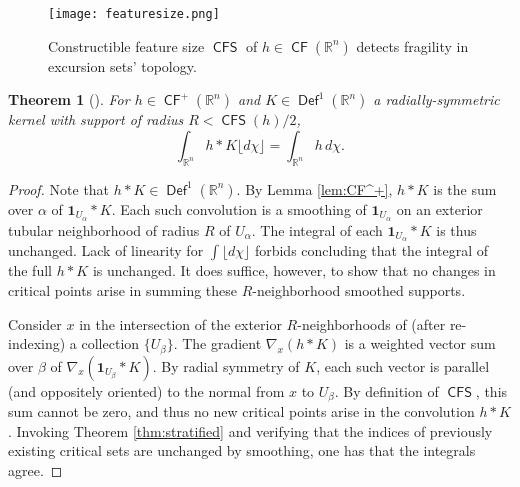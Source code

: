 \documentclass{psapm-l}
\newtheorem{theorem}{Theorem}[section]
\theoremstyle{definition}
\theoremstyle{remark}
\numberwithin{equation}{section}
\begin{document}
\begin{figure}[hbt]
\begin{center}
\texttt{[image: featuresize.png]}
\caption{Constructible feature size ${{{\operatorname{\mathsf{{CFS}}}}}}$ of $h\in{{{\operatorname{\mathsf{{CF}}}}}}({{\mathbb R}}^n)$ detects fragility in excursion sets' topology.}
\label{fig:CFS}
\end{center}
\end{figure}

\begin{theorem}[\cite{BG:PNAS}]
\label{thm:conv=}
For $h\in {{{\operatorname{\mathsf{{CF}}}}}}^+({{\mathbb R}}^n)$ and ${{K}}\in{{{\operatorname{\mathsf{{Def}}}}}}^1({{\mathbb R}}^n)$ a radially-symmetric kernel with support of radius $R<{{{\operatorname{\mathsf{{CFS}}}}}}(h)/2$,
\begin{equation}
\label{eq:conv=}
    \int_{{{\mathbb R}}^n} h*{{K}} {{\lfloor d\chi\rfloor}}
    =
    \int_{{{\mathbb R}}^n} h\,d\chi   .
\end{equation}
\end{theorem}
\begin{proof}
Note that $h*{{K}}\in{{{\operatorname{\mathsf{{Def}}}}}}^1({{\mathbb R}}^n)$. By Lemma \ref{lem:CF^+}, $h*{{K}}$ is the sum over $\alpha$ of ${{\mathbf{1}}}_{U_\alpha}*{{K}}$. Each such convolution is a smoothing of ${{\mathbf{1}}}_{U_\alpha}$ on an exterior tubular neighborhood of radius $R$ of $U_\alpha$. The integral of each ${{\mathbf{1}}}_{U_\alpha}*{{K}}$ is thus unchanged. Lack of linearity for $\int{{\lfloor d\chi\rfloor}}$ forbids concluding that the integral of the full $h*{{K}}$ is unchanged. It does suffice, however, to show that no changes in critical points arise in summing these $R$-neighborhood smoothed supports.

Consider $x$ in the intersection of the exterior $R$-neighborhoods of (after re-indexing) a collection $\{U_\beta\}$. The gradient $\nabla_x(h*{{K}})$ is a weighted vector sum over $\beta$ of $\nabla_x({{\mathbf{1}}}_{U_\beta}*{{K}})$. By radial symmetry of ${{K}}$, each such vector is parallel (and oppositely oriented) to the normal from $x$ to $U_\beta$. By definition of ${{{\operatorname{\mathsf{{CFS}}}}}}$, this sum cannot be zero, and thus no new critical points arise in the convolution $h*{{K}}$. Invoking Theorem \ref{thm:stratified} and verifying that the indices of previously existing critical sets are unchanged by smoothing, one has that the integrals agree.
\end{proof}
\end{document}
